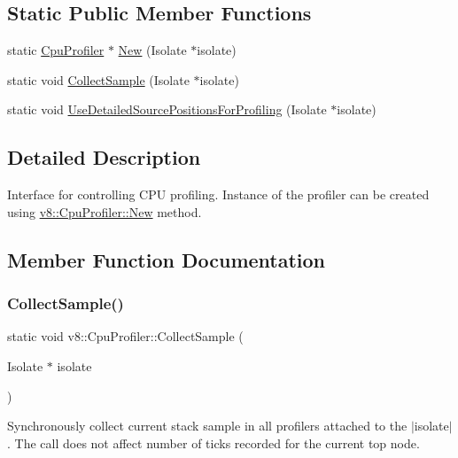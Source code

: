 \subsection*{Static Public Member Functions}
\begin{DoxyCompactItemize}
\item 
static \mbox{\hyperlink{classv8_1_1CpuProfiler}{Cpu\+Profiler}} $\ast$ \mbox{\hyperlink{classv8_1_1CpuProfiler_a9850aa42c5580c686cde1555f09577aa}{New}} (Isolate $\ast$isolate)
\item 
static void \mbox{\hyperlink{classv8_1_1CpuProfiler_a88b787078f0c8742b3c077af0de4f46b}{Collect\+Sample}} (Isolate $\ast$isolate)
\item 
static void \mbox{\hyperlink{classv8_1_1CpuProfiler_ae62325c49592ebdc030fbcf21e470c16}{Use\+Detailed\+Source\+Positions\+For\+Profiling}} (Isolate $\ast$isolate)
\end{DoxyCompactItemize}


\subsection{Detailed Description}
Interface for controlling C\+PU profiling. Instance of the profiler can be created using \mbox{\hyperlink{classv8_1_1CpuProfiler_a9850aa42c5580c686cde1555f09577aa}{v8\+::\+Cpu\+Profiler\+::\+New}} method. 

\subsection{Member Function Documentation}
\mbox{\label{classv8_1_1CpuProfiler_a88b787078f0c8742b3c077af0de4f46b}} 
\subsubsection{\texorpdfstring{Collect\+Sample()}{CollectSample()}}
{\footnotesize\ttfamily static void v8\+::\+Cpu\+Profiler\+::\+Collect\+Sample (\begin{DoxyParamCaption}\item[{Isolate $\ast$}]{isolate }\end{DoxyParamCaption})\hspace{0.3cm}{\ttfamily [static]}}

Synchronously collect current stack sample in all profilers attached to the $\vert$isolate$\vert$. The call does not affect number of ticks recorded for the current top node. \mbox{\label{classv8_1_1CpuProfiler_ab49b3f25a897dc6a359571b3014cd225}} 
